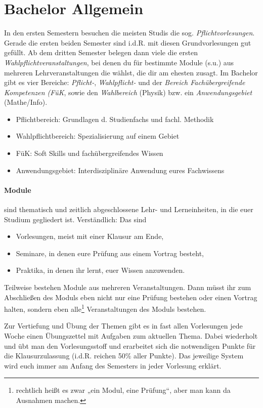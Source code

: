 \section{Bachelor Allgemein}
In den ersten Semestern besuchen die meisten Studis die sog. \emph{Pflichtvorlesungen}. Gerade die ersten beiden Semester sind i.d.R. mit diesen Grundvorlesungen gut gefüllt. Ab dem dritten Semester belegen dann viele die ersten \emph{Wahlpflichtveranstaltungen}, bei denen du für bestimmte Module (s.u.) aus mehreren Lehrveranstaltungen die wählst, die dir am ehesten zusagt. Im Bachelor gibt es vier Bereiche: \emph{Pflicht-}, \emph{Wahlpflicht-} und der \emph{Bereich Fachübergreifende Kompetenzen (FüK}, sowie den \emph{Wahlbereich} (Physik) bzw. ein \emph{Anwendungsgebiet} (Mathe/Info).

\begin{itemize}
	\item Pflichtbereich: Grundlagen d. Studienfachs und fachl. Methodik
	\item Wahlpflichtbereich: Spezialisierung auf einem Gebiet
	\item FüK: Soft Skills und fachübergreifendes Wissen
	\item Anwendungsgebiet: Interdisziplinäre Anwendung eures Fachwissens
\end{itemize}

\paragraph*{Module} sind \glqq{}thematisch und zeitlich abgeschlossene Lehr- und Lerneinheiten\grqq{}, in die euer Studium gegliedert ist. Verständlich: Das sind

\begin{itemize}
	\item Vorlesungen, meist mit einer Klausur am Ende,
	\item Seminare, in denen eure Prüfung aus einem Vortrag besteht,
	\item Praktika, in denen ihr lernt, euer Wissen anzuwenden.
\end{itemize}

Teilweise bestehen Module aus mehreren Veranstaltungen. Dann müsst ihr zum Abschließen des Moduls eben nicht nur eine Prüfung bestehen oder einen Vortrag halten, sondern eben alle\footnote{rechtlich heißt es zwar „ein Modul, eine Prüfung“, aber man kann da Ausnahmen machen.} Veranstaltungen des Moduls bestehen.

Zur Vertiefung und Übung der Themen gibt es in fast allen Vorlesungen jede Woche einen Übungszettel mit Aufgaben zum aktuellen Thema. Dabei wiederholt und übt man den Vorlesungsstoff und erarbeitet sich die notwendigen Punkte für die Klausurzulassung (i.d.R. reichen 50\% aller Punkte). Das jeweilige System wird euch immer am Anfang des Semesters in jeder Vorlesung erklärt.

